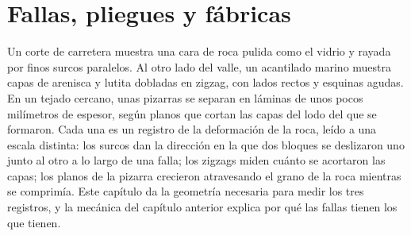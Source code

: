 \chapter{Fallas, pliegues y fábricas}\label{ch:b1:faults-folds-fabrics}

Un corte de carretera muestra una cara de roca pulida como el vidrio y rayada por finos surcos paralelos. Al otro lado del valle,
un acantilado marino muestra capas de arenisca y lutita dobladas en zigzag, con lados rectos y esquinas agudas. En un tejado
cercano, unas pizarras se separan en láminas de unos pocos milímetros de espesor, según planos que cortan las capas del lodo
del que se formaron. Cada una es un registro de la deformación de la roca, leído a una escala distinta: los surcos dan la
dirección en la que dos bloques se deslizaron uno junto al otro a lo largo de una falla; los zigzags miden cuánto se
acortaron las capas; los planos de la pizarra crecieron atravesando el grano de la roca mientras se comprimía. Este capítulo
da la geometría necesaria para medir los tres registros, y la mecánica del capítulo anterior explica por qué las fallas
tienen los  que tienen.

